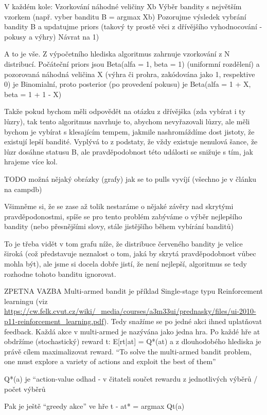 \documentclass[thesis=M,czech]{FITthesis}[2014/05/07]
\begin{document}
V každém kole:
Vzorkování náhodné veličiny Xb 
Výběr bandity s největším vzorkem (např. vyber banditu B = argmax Xb)
Pozorujme výsledek vybrání bandity B a updatujme priors (takový ty prostě věci z dřívějšího vyhodnocování - pokusy a výhry)
Návrat na 1)

A to je vše. Z výpočetního hlediska algoritmus zahrnuje vzorkování z N distribucí. Počáteční priors jsou Beta(alfa = 1, beta = 1) (uniformní rozdělení) a pozorovaná náhodná veličina X (výhra či prohra, zakódována jako 1, respektive 0) je Binomialní, proto posterior (po provedení pokusu) je Beta(alfa = 1 + X, beta = 1 + 1 - X)

Takže pokud bychom měli odpovědět na otázku z dřívějška (zda vybírat i ty lůzry), tak tento algoritmus navrhuje to, abychom nevyřazovali lůzry, ale měli bychom je vybírat s klesajícím tempem, jakmile nashromáždíme dost jistoty, že existují lepší bandité. Vyplývá to z podstaty, že vždy existuje nenulová šance, že lůzr dosáhne statusu B, ale pravděpodobnost této události se snižuje s tím, jak hrajeme více kol. 

TODO možná nějaký obrázky (grafy) jak se to pulls vyvíjí (všechno je v článku na campdb)

Všimněme si, že se zase až tolik nestaráme o nějaké závěry nad skrytými pravděpodonostmi, spíše se pro tento problém zabýváme o výběr nejlepšího bandity (nebo přesnějšími slovy, stále jistějšího během vybírání banditů)

To je třeba vidět v tom grafu níže, že distribuce červeného bandity je velice široká (což představuje neznalost o tom, jaká by skrytá pravděpodobnost vůbec mohla být), ale jsme si docela dobře jistí, že není nejlepší, algoritmus se tedy rozhodne tohoto banditu ignorovat.

ZPETNA VAZBA
Multi-armed bandit je příklad Single-stage typu Reinforcement learningu (viz \url{https://cw.felk.cvut.cz/wiki/_media/courses/a3m33ui/prednasky/files/ui-2010-p11-reinforcement_learning.pdf}). Tedy snažíme se po jedné akci ihned uplatňovat feedback. Každá akce v multi-armed je nazývána jako jedna hra. Po každé hře at obdržíme (stochastický) reward t:
E[rt|at] = Q*(at) a z dlouhodobého hlediska je právě cílem maximalizovat reward.
“To solve the multi-armed bandit problem, one must explore a variety of
actions and exploit the best of them”

Q*(a) je “action-value odhad - v čitateli součet rewardu z jednotlivých výběrů / počet výběrů

Pak je ještě “greedy akce” ve hře t - at* = argmax Qt(a) 
\end{document}
